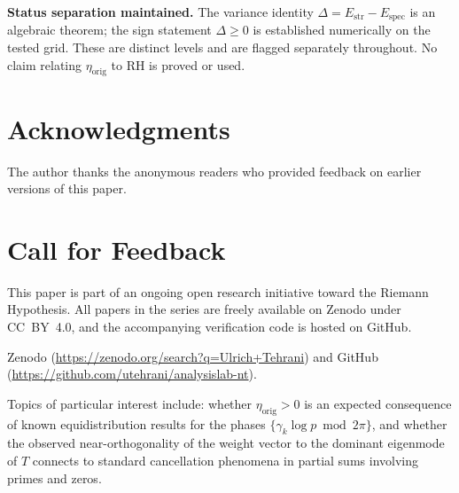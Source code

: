\documentclass[11pt]{article}
\newcommand{\Estr}{E_{\mathrm{str}}}
\newcommand{\Espec}{E_{\mathrm{spec}}}
\newcommand{\etaorig}{\eta_{\mathrm{orig}}}
\begin{document}
\textbf{Status separation maintained.}
The variance identity $\Delta=\Estr-\Espec$ is an algebraic theorem;
the sign statement $\Delta\geq 0$ is established numerically on the
tested grid. These are distinct levels and are flagged separately
throughout. No claim relating $\etaorig$ to RH is proved or used.

\section*{Acknowledgments}

The author thanks the anonymous readers who provided feedback on
earlier versions of this paper.

\section*{Call for Feedback}

This paper is part of an ongoing open research initiative toward the
Riemann Hypothesis.
All papers in the series are freely available on Zenodo under CC~BY~4.0,
and the accompanying verification code is hosted on GitHub.

{\sloppy
Zenodo (\url{https://zenodo.org/search?q=Ulrich+Tehrani}) and GitHub
(\url{https://github.com/utehrani/analysislab-nt}).
\par}

Topics of particular interest include: whether $\etaorig>0$ is an
expected consequence of known equidistribution results for the phases
$\{\gamma_k\log p \bmod 2\pi\}$, and whether the observed
near-orthogonality of the weight vector to the dominant eigenmode of
$T$ connects to standard cancellation phenomena in partial sums
involving primes and zeros.

\end{document}
